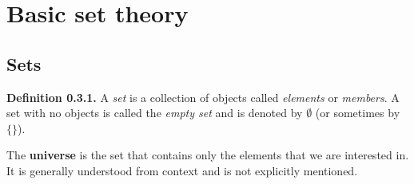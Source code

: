 \documentclass[12pt, letterpaper, oneside]{book}
\begin{document}
\section{Basic set theory}

\subsection{Sets}

\textbf{Definition 0.3.1.} A \textit{set} is a collection of objects called
\textit{elements} or \textit{members}. A set with no objects is called the
\textit{empty set} and is denoted by $\emptyset$ (or sometimes by $\{\}$).

The \textbf{universe} is the set that contains only the elements that we are
interested in. It is generally understood from context and is not explicitly
mentioned.
\end{document}
